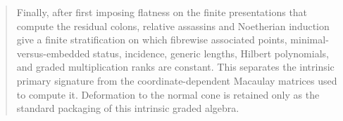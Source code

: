 \begin{abstract}
Finally, after first imposing flatness on the finite presentations that
compute the residual colons, relative assassins and Noetherian induction
give a finite stratification on which fibrewise associated points,
minimal-versus-embedded status, incidence, generic lengths, Hilbert
polynomials, and graded multiplication ranks are constant.  This
separates the intrinsic primary signature from the coordinate-dependent
Macaulay matrices used to compute it.  Deformation to the normal cone
is retained only as the standard packaging of this intrinsic graded
algebra.
\end{abstract}
\maketitle
